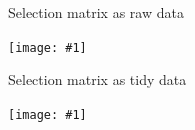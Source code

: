 \documentclass[14pt,ignorenonframetext,]{beamer}
\def\fullwidth#1{\vspace*{-0.2cm}\par\centerline{\texttt{[image: \#1]}}}
\def\fullheight#1{\vspace*{-0.2cm}\par\centerline{\texttt{[image: \#1]}}}
\begin{document}
\begin{frame}{Selection matrix as raw data}
\protect\hypertarget{selection-matrix-as-raw-data}{}

\fullwidth{al_matrix}

\end{frame}

\begin{frame}{Selection matrix as tidy data}
\protect\hypertarget{selection-matrix-as-tidy-data}{}

\fullheight{al_matrix_tidy}

\end{frame}
\end{document}
